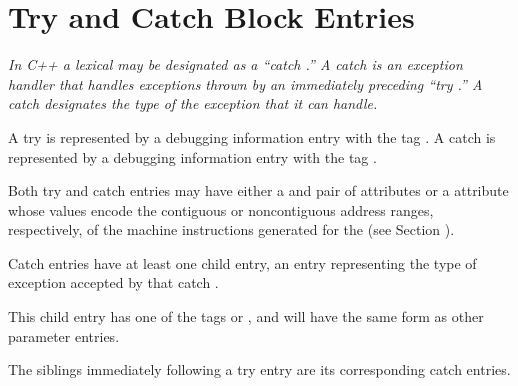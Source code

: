 \section{Try and Catch Block Entries}
\label{chap:tryandcatchblockentries}

\textit{In C++ a lexical  may be 
designated as a ``catch .'' 
A catch  is an 
exception handler that handles
exceptions thrown by an immediately 
preceding ``try .''
A catch  
designates the type of the exception that it
can handle.}

A try  is represented 
by a debugging information entry
with the tag .  
A catch  is represented by
a debugging information entry with 
the tag .

Both try and catch  entries may have either a
 and  pair of attributes or a
 attribute whose values encode the contiguous
or non\dash contiguous address ranges, respectively, of the
machine instructions generated for the 
(see Section
).

Catch  entries have at 
least one child entry, an
entry representing the type of exception accepted by
that catch . 

This child entry has one of the 
tags
 or ,
and will have the same form as other parameter entries.

The siblings immediately following 
a try  entry are its
corresponding catch  entries.







